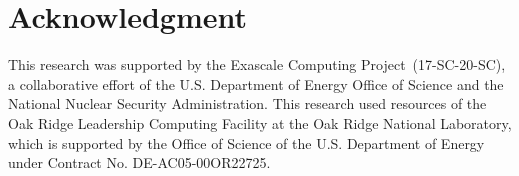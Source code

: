 \documentclass[runningheads]{llncs}
\begin{document}
\vspace{-2mm}
\section*{Acknowledgment}
This research was supported by the Exascale Computing Project~(17-SC-20-SC), a collaborative effort of the U.S. Department of Energy Office of Science and the National Nuclear Security Administration. 
%
%
This research used resources of the Oak Ridge Leadership Computing Facility at the Oak Ridge National Laboratory, which is supported by the Office of Science of the U.S. Department of Energy under Contract No. DE-AC05-00OR22725.
%



\end{document}

